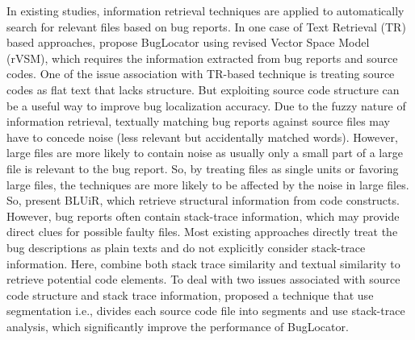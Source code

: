 \documentclass[conference]{IEEEtran}
\begin{document}
In existing studies, information retrieval techniques  \cite{Jian} \cite{Saha} \cite{Moreno} \cite{Anh} \cite{Lukins} are applied to automatically search for relevant files based on bug reports.
In one case of Text Retrieval (TR) based approaches, \citet{Jian} propose BugLocator using revised Vector Space Model (rVSM), which requires the information extracted from bug reports and source codes. One of the issue association with TR-based technique is treating source codes as flat text that lacks structure. But exploiting source code structure can be a useful way to improve bug localization accuracy.
Due to the fuzzy nature of information retrieval, textually matching bug reports against source
files may have to concede noise (less relevant but accidentally matched words). However, large files are more
likely to contain noise as usually only a small part
of a large file is relevant to the bug report. So, by treating
files as single units or favoring large files, the techniques are more
likely to be affected by the noise in large files. So, \citet{Saha} present BLUiR, which retrieve structural information from code constructs.
However, bug reports often contain stack-trace information, which may provide direct clues for possible faulty files. Most existing approaches directly treat the bug descriptions as plain texts and do not explicitly consider stack-trace information. Here, \citet{Moreno} combine both stack trace similarity and textual similarity to retrieve potential code elements. 
To deal with two issues associated with source code structure and stack trace information, 
\citet{Chu}  proposed  a technique that use segmentation i.e., divides each source code file into segments and use stack-trace analysis, which significantly improve the performance of BugLocator.
\end{document}
